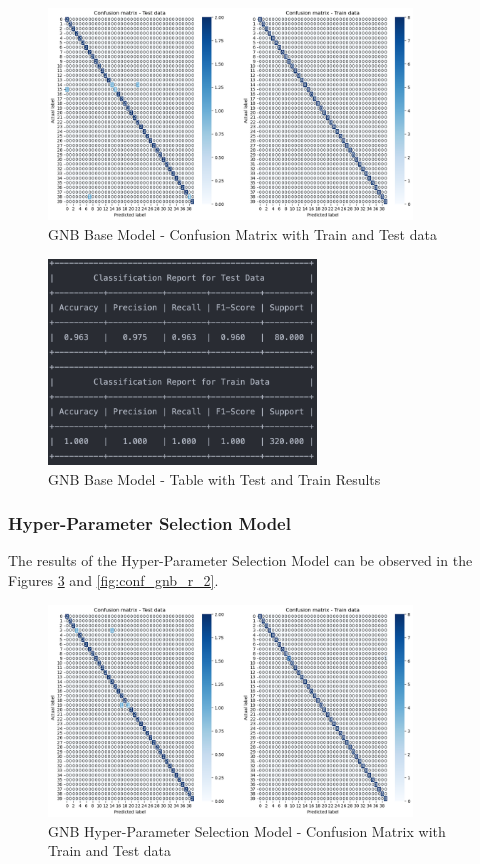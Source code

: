\documentclass[conference]{IEEEtran}
\begin{document}
\begin{figure}[H]
    \centering
    \includegraphics[width=3.8in]{GNB/1.png}%
    \caption{GNB Base Model - Confusion Matrix with Train and Test data}%
    \label{fig:conf_gnb_1}%
\end{figure}

\begin{figure}[H]
    \centering
    \includegraphics[width=2.8in]{GNB/r_1.png}%
    \caption{GNB Base Model - Table with Test and Train Results}%
    \label{fig:conf_gnb_r_1}%
\end{figure}

\subsubsection{Hyper-Parameter Selection Model}
The results of the Hyper-Parameter Selection Model can be observed in the Figures \ref{fig:conf_gnb_2} and \ref{fig:conf_gnb_r_2}. 

\begin{figure}[H]
    \centering
    \includegraphics[width=3.8in]{GNB/2.png}%
    \caption{GNB Hyper-Parameter Selection Model - Confusion Matrix with Train and Test data}%
    \label{fig:conf_gnb_2}%
\end{figure}
\end{document}
